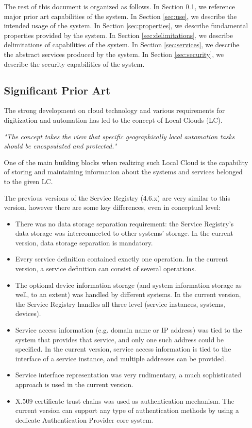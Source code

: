 \documentclass[a4paper]{arrowhead}
\begin{document}
The rest of this document is organized as follows.
In Section \ref{sec:prior_art}, we reference major prior art capabilities
of the system.
In Section \ref{sec:use}, we describe the intended usage of the system.
In Section \ref{sec:properties}, we describe fundamental properties
provided by the system.
In Section \ref{sec:delimitations}, we describe delimitations of capabilities
of the system.
In Section \ref{sec:services}, we describe the abstract services produced by the system.
In Section \ref{sec:security}, we describe the security capabilities
of the system.

\subsection{Significant Prior Art}
\label{sec:prior_art}

The strong development on cloud technology and various requirements for digitization and automation has led to the concept of Local Clouds (LC).

\textit{"The concept takes the view that specific geographically local automation tasks should be encapsulated and protected."} \cite{jerker2017localclouds}

One of the main building blocks when realizing such Local Cloud is the capability of storing and maintaining information about the systems and services belonged to the given LC.

The previous versions of the Service Registry (4.6.x) are very similar to this version, however there are some key differences, even in conceptual level:

\begin{itemize}
    \item There was no data storage separation requirement: the Service Registry's data storage was interconnected to other systems' storage. In the current version, data storage separation is mandatory.
    \item Every service definition contained exactly one operation. In the current version, a service definition can consist of several operations.
    \item The optional device information storage (and system information storage as well, to an extent) was handled by different systems. In the current version, the Service Registry handles all three level (service instances, systems, devices).
    \item Service access information (e.g. domain name or IP address) was tied to the system that provides that service, and only one such address could be specified. In the current version, service access information is tied to the interface of a service instance, and multiple addresses can be provided.
    \item Service interface representation was very rudimentary, a much sophisticated approach is used in the current version.
    \item X.509 certificate trust chains was used as authentication mechanism. The current version can support any type of authentication methods by using a dedicate Authentication Provider core system.
\end{itemize}
\end{document}
